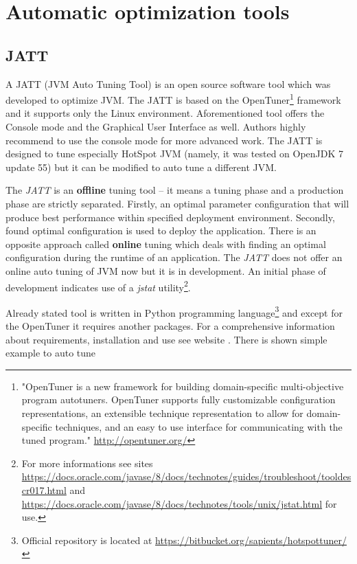 \documentclass[
  digital, %
  oneside,
  notable, %
  nolof,     %
  nolot     %
]{fithesis3}
\begin{document}
\section{Automatic optimization tools}\label{autoopt}

\subsection{JATT}
A JATT (JVM Auto Tuning Tool) is an open source software tool which was developed to optimize JVM. The JATT is based on the OpenTuner\footnote{"OpenTuner is a new framework for building domain-specific multi-objective program autotuners. OpenTuner supports fully customizable configuration representations, an extensible technique representation to allow for domain-specific techniques, and an easy to use interface for communicating with the tuned program." \url{http://opentuner.org/}} framework and it supports only the Linux environment. Aforementioned tool offers the Console mode and the Graphical User Interface as well. Authors highly recommend to use the console mode for more advanced work. The JATT is designed to tune especially HotSpot JVM (namely, it was tested on OpenJDK 7 update 55) but it can be modified to auto tune a different JVM.
\cite{jatt-web} \cite{jatt-web-dzone}

The \textit{JATT} is an \textbf{offline} tuning tool -- it means a tuning phase and a production phase are strictly separated. Firstly, an optimal parameter configuration that will produce best performance within specified deployment environment. Secondly, found optimal configuration is used to deploy the application. There is an opposite approach called \textbf{online} tuning which deals with finding an optimal configuration during the runtime of an application. The \textit{JATT} does not offer an online auto tuning of JVM now but it is in development. 
An initial phase of development indicates use of a \textit{jstat} utility\footnote{For more informations see sites \url{https://docs.oracle.com/javase/8/docs/technotes/guides/troubleshoot/tooldescr017.html} and \url{https://docs.oracle.com/javase/8/docs/technotes/tools/unix/jstat.html} for use.}. \cite{jatt}

Already stated tool is written in Python programming language\footnote{Official repository is located at \url{https://bitbucket.org/sapients/hotspottuner/}} and except for the OpenTuner it requires another packages. For a comprehensive information about requirements, installation and use see website \cite{jatt-web-medium}. There is shown simple example to auto tune 
\end{document}
